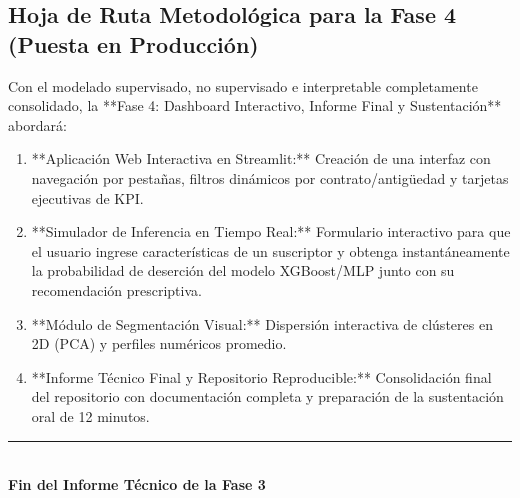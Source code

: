 \documentclass[11pt,letterpaper]{article}
\begin{document}
\subsection{Hoja de Ruta Metodológica para la Fase 4 (Puesta en Producción)}
Con el modelado supervisado, no supervisado e interpretable completamente consolidado, la **Fase 4: Dashboard Interactivo, Informe Final y Sustentación** abordará:
\begin{enumerate}
    \item **Aplicación Web Interactiva en Streamlit:** Creación de una interfaz con navegación por pestañas, filtros dinámicos por contrato/antigüedad y tarjetas ejecutivas de KPI.
    \item **Simulador de Inferencia en Tiempo Real:** Formulario interactivo para que el usuario ingrese características de un suscriptor y obtenga instantáneamente la probabilidad de deserción del modelo XGBoost/MLP junto con su recomendación prescriptiva.
    \item **Módulo de Segmentación Visual:** Dispersión interactiva de clústeres en 2D (PCA) y perfiles numéricos promedio.
    \item **Informe Técnico Final y Repositorio Reproducible:** Consolidación final del repositorio con documentación completa y preparación de la sustentación oral de 12 minutos.
\end{enumerate}

\vspace{0.8cm}
\begin{center}
    \rule{0.6\linewidth}{0.6pt}\\
    \small \textbf{Fin del Informe Técnico de la Fase 3}
\end{center}
\end{document}
